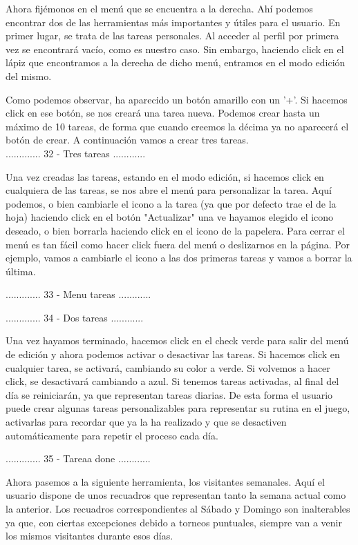 Ahora fijémonos en el menú que se encuentra a la derecha. Ahí podemos encontrar dos de las herramientas más importantes y útiles para el usuario. En primer lugar, se trata de las tareas personales. Al acceder al perfil por primera vez se encontrará vacío, como es nuestro caso. Sin embargo, haciendo click en el lápiz que encontramos a la derecha de dicho menú, entramos en el modo edición del mismo.\\


Como podemos observar, ha aparecido un botón amarillo con un '+'. Si hacemos click en ese botón, se nos creará una tarea nueva. Podemos crear hasta un máximo de 10 tareas, de forma que cuando creemos la décima ya no aparecerá el botón de crear. A continuación vamos a crear tres tareas.\\

............. 32 - Tres tareas ............

Una vez creadas las tareas, estando en el modo edición, si hacemos click en cualquiera de las
tareas, se nos abre el menú para personalizar la tarea. Aquí podemos, o bien cambiarle el icono
a la tarea (ya que por defecto trae el de la hoja) haciendo click en el botón "Actualizar" una ve
hayamos elegido el icono deseado, o bien borrarla haciendo click en el icono de la papelera.
Para cerrar el menú es tan fácil como hacer click fuera del menú o deslizarnos en la página.
Por ejemplo, vamos a cambiarle el icono a las dos primeras tareas y vamos a borrar la última.

............. 33 - Menu tareas ............

............. 34 - Dos tareas ............

Una vez hayamos terminado, hacemos click en el check verde para salir del menú de edición y
ahora podemos activar o desactivar las tareas. Si hacemos click en cualquier tarea, se activará,
cambiando su color a verde. Si volvemos a hacer click, se desactivará cambiando a azul. Si tenemos
tareas activadas, al final del día se reiniciarán, ya que representan tareas diarias. De esta forma
el usuario puede crear algunas tareas personalizables para representar su rutina en el juego,
activarlas para recordar que ya la ha realizado y que se desactiven automáticamente para repetir
el proceso cada día.

............. 35 - Tareaa done ............


Ahora pasemos a la siguiente herramienta, los visitantes semanales. Aquí el usuario dispone de
unos recuadros que representan tanto la semana actual como la anterior. Los recuadros correspondientes
al Sábado y Domingo son inalterables ya que, con ciertas excepciones debido a torneos puntuales,
siempre van a venir los mismos visitantes durante esos días.

